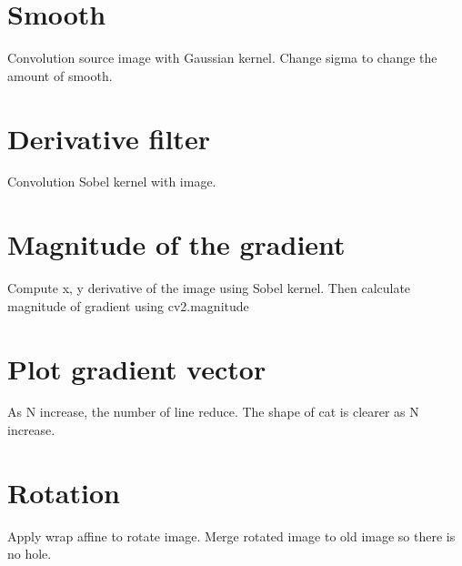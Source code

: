 \documentclass[]{article}
\begin{document}
\section{Smooth}
Convolution source image with Gaussian kernel. Change sigma to change the amount of smooth.

\section{Derivative filter}
Convolution Sobel kernel with image. 

\section{Magnitude of the gradient}
Compute x, y derivative of the image using Sobel kernel. Then calculate magnitude of gradient using cv2.magnitude 

\section{Plot gradient vector}
As N increase, the number of line reduce. The shape of cat is clearer as N increase.

\section{Rotation}
Apply wrap affine to rotate image. Merge rotated image to old image so there is no hole. 
\end{document}
